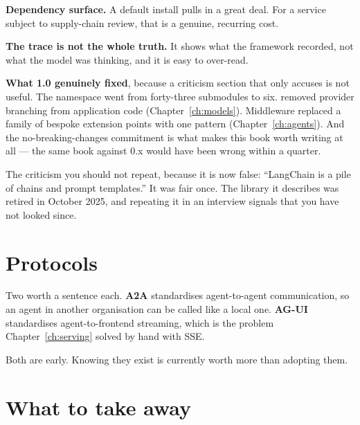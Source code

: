 \textbf{Dependency surface.} A default install pulls in a great deal. For a
service subject to supply-chain review, that is a genuine, recurring cost.

\textbf{The trace is not the whole truth.} It shows what the framework recorded,
not what the model was thinking, and it is easy to over-read.

\begin{note}
\textbf{What 1.0 genuinely fixed}, because a criticism section that only accuses
is not useful. The namespace went from forty-three submodules to six.
 removed provider branching from application code
(Chapter~\ref{ch:models}). Middleware replaced a family of bespoke extension
points with one pattern (Chapter~\ref{ch:agents}). And the no-breaking-changes
commitment is what makes this book worth writing at all --- the same book against
0.x would have been wrong within a quarter.
\end{note}

\begin{warning}
The criticism you should not repeat, because it is now false: ``LangChain is a
pile of chains and prompt templates.'' It was fair once. The library it describes
was retired in October 2025, and repeating it in an interview signals that you
have not looked since.
\end{warning}

\section{Protocols}
\label{sec:protocols}

Two worth a sentence each. \textbf{A2A} standardises agent-to-agent
communication, so an agent in another organisation can be called like a local
one. \textbf{AG-UI} standardises agent-to-frontend streaming, which is the
problem Chapter~\ref{ch:serving} solved by hand with SSE.

Both are early. Knowing they exist is currently worth more than adopting them.

\section{What to take away}
\label{sec:ch16-summary}

